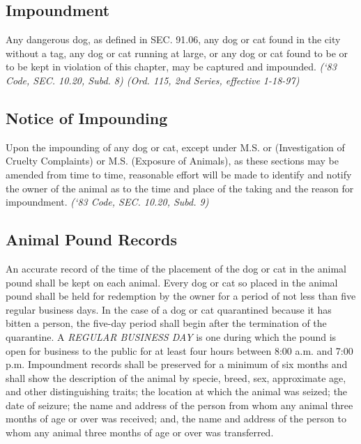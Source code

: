 \subsection{Impoundment}
Any dangerous dog, as defined in SEC. 91.06, any dog or cat found in the city without a tag, any dog or cat running at large, or any dog or cat found to be or to be kept in violation of this chapter, may be captured and impounded. \emph{(‘83 Code, SEC. 10.20, Subd. 8)  (Ord. 115, 2nd Series, effective 1-18-97)}
\subsection{Notice of Impounding}
Upon the impounding of any dog or cat, except under M.S.  or  (Investigation of Cruelty Complaints) or M.S.  (Exposure of Animals), as these sections may be amended from time to time, reasonable effort will be made to identify and notify the owner of the animal as to the time and place of the taking and the reason for impoundment. \emph{(‘83 Code, SEC. 10.20, Subd. 9)}
\subsection{Animal Pound Records}
An accurate record of the time of the placement of the dog or cat in the animal pound shall be kept on each animal. Every dog or cat so placed in the animal pound shall be held for redemption by the owner for a period of not less than five regular business days. In the case of a dog or cat quarantined because it has bitten a person, the five-day period shall begin after the termination of the quarantine. A \emph{REGULAR BUSINESS DAY} is one during which the pound is open for business to the public for at least four hours between 8:00 a.m. and 7:00 p.m. Impoundment records shall be preserved for a minimum of six months and shall show the description of the animal by specie, breed, sex, approximate age, and other distinguishing traits; the location at which the animal was seized; the date of seizure; the name and address of the person from whom any animal three months of age or over was received; and, the name and address of the person to whom any animal three months of age or over was transferred.
